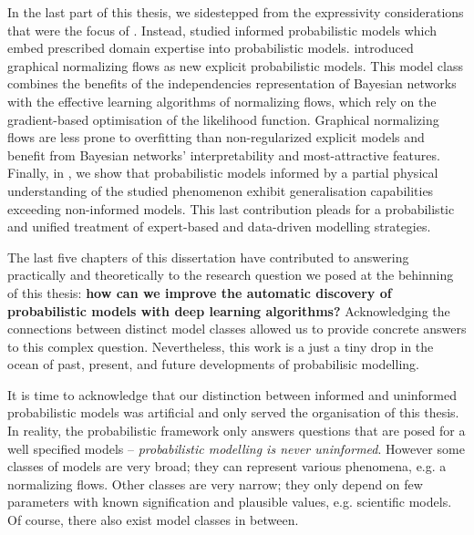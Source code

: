 In the last part of this thesis, we sidestepped from the expressivity considerations that were the focus of . Instead,  studied informed probabilistic models which embed prescribed domain expertise into probabilistic models.  introduced graphical normalizing flows as new explicit probabilistic models. This model class combines the benefits of the independencies representation of Bayesian networks with the effective learning algorithms of normalizing flows, which rely on the gradient-based optimisation of the likelihood function. Graphical normalizing flows are less prone to overfitting than non-regularized explicit models and benefit from Bayesian networks' interpretability and most-attractive features. Finally, in , we show that probabilistic models informed by a partial physical understanding of the studied phenomenon exhibit generalisation capabilities exceeding non-informed models. This last contribution pleads for a probabilistic and unified treatment of expert-based and data-driven modelling strategies.

The last five chapters of this dissertation have contributed to answering practically and theoretically to the research question we posed at the behinning of this thesis: \textbf{how can we improve the automatic discovery of probabilistic models with deep learning algorithms?} Acknowledging the connections between distinct model classes allowed us to provide concrete answers to this complex question. Nevertheless, this work is a just a tiny drop in the ocean of past, present, and future developments of probabilisic modelling.

It is time to acknowledge that our distinction between informed and uninformed probabilistic models was artificial and only served the organisation of this thesis. In reality, the probabilistic framework only answers questions that are posed for a well specified models -- \textit{probabilistic modelling is never uninformed}. However some classes of models are very broad; they can represent various phenomena, e.g. a normalizing flows. Other classes are very narrow; they only depend on few parameters with known signification and plausible values, e.g. scientific models. Of course, there also exist model classes in between.


